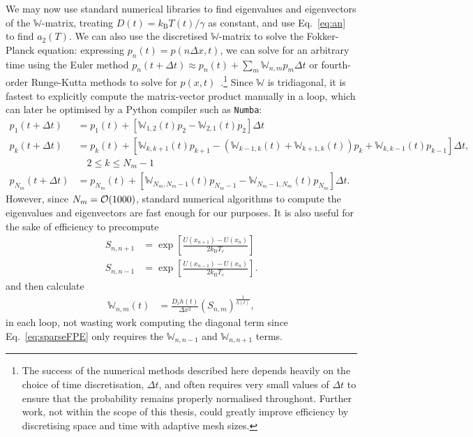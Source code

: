 \documentclass[hyperref={colorlinks=true, urlcolor=blue, citecolor=blue, final, bound}]{sfuthesis}
\newcommand{\kB}{k_{\mathrm{B}}}
\begin{document}
We may now use standard numerical libraries to find eigenvalues and eigenvectors of the $\mathbb{W}$-matrix, treating $D(t) = \kB T(t)/\gamma$ as constant, and use Eq.~\ref{eq:an} to find $a_2(T)$. We can also use the discretised $\mathbb W$-matrix to solve the Fokker-Planck equation: expressing $p_n(t) = p(n\Delta x, t)$, we can solve for an arbitrary time using the Euler method $p_n(t+\Delta t) \approx p_n(t)+\sum_{m}\mathbb W_{n,m}p_{m}\Delta t$ or fourth-order Runge-Kutta methods to solve for $p(x,t)$~\cite{Press2007}.\footnote{The success of the numerical methods described here depends heavily on the choice of time discretisation, $\Delta t$, and often requires very small values of $\Delta t$ to ensure that the probability remains properly normalised throughout. Further work, not within the scope of this thesis, could greatly improve efficiency by discretising space and time with adaptive mesh sizes.} Since $\mathbb W$ is tridiagonal, it is fastest to explicitly compute the matrix-vector product manually in a loop, which can later be optimised by a Python compiler such as \texttt{Numba}:
\begin{align*}
    p_1(t+\Delta t) &= p_1(t) + [\mathbb W_{1,2}(t)p_2-\mathbb W_{2,1}(t)p_2]\Delta t\\
    p_k(t+\Delta t) &= p_k(t) + [\mathbb W_{k,k+1}(t)p_{k+1}-(\mathbb W_{k-1,k}(t)+\mathbb W_{k+1,k}(t))p_k + \mathbb W_{k,k-1}(t)p_{k-1}]\Delta t,\\ &\quad 2\leq k \leq N_m-1\\
    p_{N_m}(t+\Delta t) &= p_{N_m}(t) + [\mathbb W_{N_m,N_m-1}(t)p_{N_m-1}-\mathbb W_{N_m-1,N_m}(t)p_{N_m}]\Delta t.\label{eq:sparseFPE}
\end{align*}
However, since $N_m=\order{1000}$, standard numerical algorithms to compute the eigenvalues and eigenvectors are fast enough for our purposes. It is also useful for the sake of efficiency to precompute
\begin{align}
    S_{n,n+1} &= \exp[\frac{U(x_{n+1})-U(x_n)}{2\kB T_c}]\\
    S_{n,n-1} &= \exp[\frac{U(x_{n-1})-U(x_n)}{2\kB T_c}].
\end{align}
and then calculate
\begin{align}
    \mathbb W_{n,m}(t) &= \frac{D_ch(t)}{\Delta x^2}(S_{n,m})^{\frac 1{h(t)}},
\end{align}
in each loop, not wasting work computing the diagonal term since Eq.~\ref{eq:sparseFPE} only requires the $\mathbb W_{n,n-1}$ and $\mathbb W_{n,n+1}$ terms.
\end{document}
